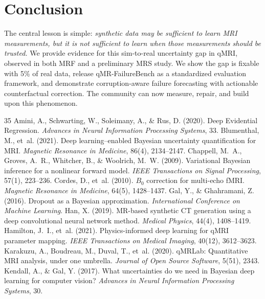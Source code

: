 \documentclass[11pt,a4paper]{article}
\begin{document}
\section{Conclusion}

The central lesson is simple: \emph{synthetic data may be sufficient to learn MRI measurements, but it is not sufficient to learn when those measurements should be trusted.} We provide evidence for this sim-to-real uncertainty gap in qMRI, observed in both MRF and a preliminary MRS study. We show the gap is fixable with 5\% of real data, release qMR-FailureBench as a standardized evaluation framework, and demonstrate corruption-aware failure forecasting with actionable counterfactual correction. The community can now measure, repair, and build upon this phenomenon.

\begin{thebibliography}{35}
 Amini, A., Schwarting, W., Soleimany, A., \& Rus, D. (2020). Deep Evidential Regression. \emph{Advances in Neural Information Processing Systems}, 33.
 Blumenthal, M., et~al. (2021). Deep learning--enabled Bayesian uncertainty quantification for MRI. \emph{Magnetic Resonance in Medicine}, 86(4), 2134--2147.
 Chappell, M.~A., Groves, A.~R., Whitcher, B., \& Woolrich, M.~W. (2009). Variational Bayesian inference for a nonlinear forward model. \emph{IEEE Transactions on Signal Processing}, 57(1), 223--236.
 Cordes, D., et~al. (2010). $B_0$ correction for multi-echo fMRI. \emph{Magnetic Resonance in Medicine}, 64(5), 1428--1437.
 Gal, Y., \& Ghahramani, Z. (2016). Dropout as a Bayesian approximation. \emph{International Conference on Machine Learning}.
 Han, X. (2019). MR-based synthetic CT generation using a deep convolutional neural network method. \emph{Medical Physics}, 44(4), 1408--1419.
 Hamilton, J.~I., et~al. (2021). Physics-informed deep learning for qMRI parameter mapping. \emph{IEEE Transactions on Medical Imaging}, 40(12), 3612--3623.
 Karakuzu, A., Boudreau, M., Duval, T., et~al. (2020). qMRLab: Quantitative MRI analysis, under one umbrella. \emph{Journal of Open Source Software}, 5(51), 2343.
 Kendall, A., \& Gal, Y. (2017). What uncertainties do we need in Bayesian deep learning for computer vision? \emph{Advances in Neural Information Processing Systems}, 30.

\end{thebibliography}
\end{document}
